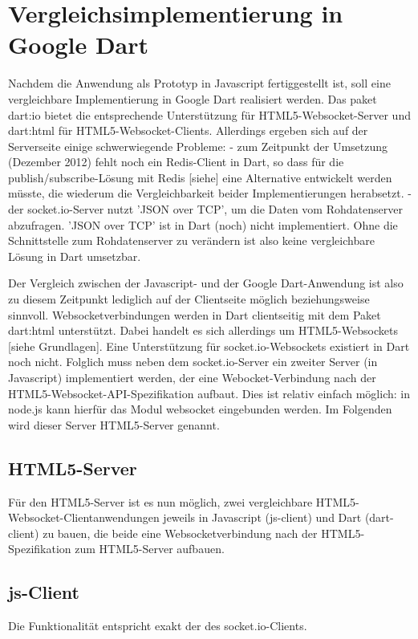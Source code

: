 \section{Vergleichsimplementierung in Google Dart}

Nachdem die Anwendung als Prototyp in Javascript fertiggestellt ist, soll eine vergleichbare Implementierung in Google Dart realisiert werden. Das paket dart:io bietet die entsprechende Unterstützung für HTML5-Websocket-Server und dart:html für HTML5-Websocket-Clients.
Allerdings ergeben sich auf der Serverseite einige schwerwiegende Probleme:
- zum Zeitpunkt der Umsetzung (Dezember 2012) fehlt noch ein Redis-Client in Dart, so dass für die publish/subscribe-Lösung mit Redis [siehe] eine Alternative entwickelt werden müsste, die wiederum die Vergleichbarkeit beider Implementierungen herabsetzt.
- der socket.io-Server nutzt 'JSON over TCP', um die Daten vom Rohdatenserver abzufragen. 'JSON over TCP' ist in Dart (noch) nicht implementiert. Ohne die Schnittstelle zum Rohdatenserver zu verändern ist also keine vergleichbare Lösung in Dart umsetzbar.

Der Vergleich zwischen der Javascript- und der Google Dart-Anwendung ist also zu diesem Zeitpunkt lediglich auf der Clientseite möglich beziehungsweise sinnvoll. 
Websocketverbindungen werden in Dart clientseitig mit dem Paket dart:html unterstützt. Dabei handelt es sich allerdings um HTML5-Websockets [siehe Grundlagen]. Eine Unterstützung für socket.io-Websockets existiert in Dart noch nicht.
Folglich muss neben dem socket.io-Server ein zweiter Server (in Javascript) implementiert werden, der eine Webocket-Verbindung nach der HTML5-Websocket-API-Spezifikation aufbaut. Dies ist relativ einfach  möglich: in node.js kann hierfür das Modul websocket eingebunden werden. Im Folgenden wird dieser Server HTML5-Server genannt.

\subsection{HTML5-Server}

Für den HTML5-Server ist es nun möglich, zwei vergleichbare HTML5-Websocket-Clientanwendungen jeweils in Javascript (js-client) und Dart (dart-client) zu bauen, die beide eine Websocketverbindung nach der HTML5-Spezifikation zum HTML5-Server aufbauen.

\subsection{js-Client}
Die Funktionalität entspricht exakt der des socket.io-Clients. 

